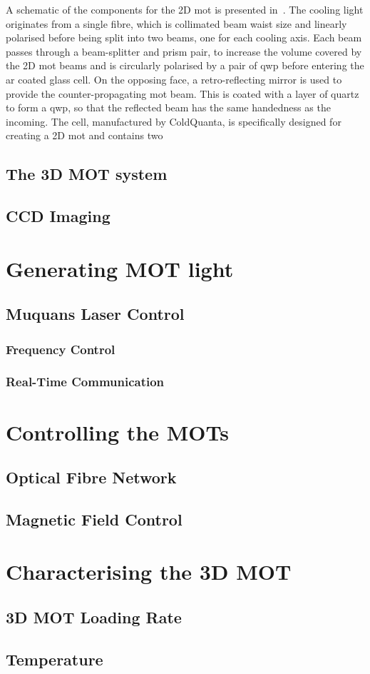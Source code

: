 A schematic of the components for the 2D \ac{mot} is presented in~. The cooling light originates from a single fibre, which is collimated {\huge beam waist size} and linearly polarised before being split into two beams, one for each cooling axis. Each beam passes through a beam-splitter and prism pair, to increase the volume covered by the 2D \ac{mot} beams and is circularly polarised by a pair of \ac{qwp} before entering the \ac{ar} coated glass cell. On the opposing face, a retro-reflecting mirror is used to provide the counter-propagating \ac{mot} beam. This is coated with a layer of quartz to form a \ac{qwp}, so that the reflected beam has the same handedness as the incoming. The cell, manufactured by ColdQuanta, is specifically designed for creating a 2D \ac{mot} and contains two   
\subsection{The 3D MOT system}\label{sec:3d_mot}
\subsection{CCD Imaging}\label{sec:imaging}

\section{Generating MOT light}
\subsection{Muquans Laser Control}
\subsubsection{Frequency Control}
\subsubsection{Real-Time Communication} \label{subsec:muquans_comm}

\section{Controlling the MOTs}
\subsection{Optical Fibre Network}
\subsection{Magnetic Field Control}

\section{Characterising the 3D MOT}
\subsection{3D MOT Loading Rate}\label{subsec:loading_rate}
\subsection{Temperature}


